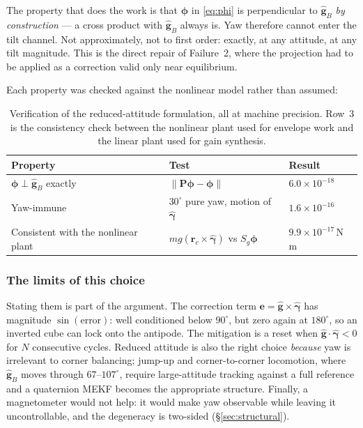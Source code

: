 The property that does the work is that $\bm{\phi}$ in \eqref{eq:phi} is
perpendicular to $\hat{\bm{g}}_B$ \emph{by construction} --- a cross product
with $\hat{\bm{g}}_B$ always is. Yaw therefore cannot enter the tilt channel.
Not approximately, not to first order: exactly, at any attitude, at any tilt
magnitude. This is the direct repair of Failure~2, where the projection had
to be applied as a correction valid only near equilibrium.

Each property was checked against the nonlinear model rather than assumed:

\begin{table}[htbp]
\centering
\small
\begin{tabular}{@{}lll@{}}
\toprule
\textbf{Property} & \textbf{Test} & \textbf{Result}\\
\midrule
$\bm{\phi}\perp\hat{\bm{g}}_B$ exactly &
  $\lVert\bm{P}\bm{\phi}-\bm{\phi}\rVert$ & $6.0\times10^{-18}$\\
Yaw-immune &
  $30^\circ$ pure yaw, motion of $\hat{\bm{\gamma}}$ & $1.6\times10^{-16}$\\
Consistent with the nonlinear plant &
  $mg(\bm{r}_c\times\hat{\bm{\gamma}})$ vs $S_g\bm{\phi}$ &
  $9.9\times10^{-17}$\,N\,m\\
\bottomrule
\end{tabular}
\caption{Verification of the reduced-attitude formulation, all at machine
precision. Row~3 is the consistency check between the nonlinear plant used
for envelope work and the linear plant used for gain synthesis.}
\label{tab:gam-verification}
\end{table}

\subsubsection{The limits of this choice}

Stating them is part of the argument. The correction term
$\bm{e}=\hat{\bm{g}}\times\hat{\bm{\gamma}}$ has magnitude
$\sin(\text{error})$: well conditioned below $90^\circ$, but zero again at
$180^\circ$, so an inverted cube can lock onto the antipode. The mitigation
is a reset when $\hat{\bm{g}}\cdot\hat{\bm{\gamma}}<0$ for $N$ consecutive
cycles. Reduced attitude is also the right choice \emph{because} yaw is
irrelevant to corner balancing; jump-up and corner-to-corner locomotion,
where $\hat{\bm{g}}_B$ moves through $67$--$107^\circ$, require large-attitude
tracking against a full reference and a quaternion MEKF becomes the
appropriate structure. Finally, a magnetometer would not help: it would make
yaw observable while leaving it uncontrollable, and the degeneracy is
two-sided (\S\ref{sec:structural}).


